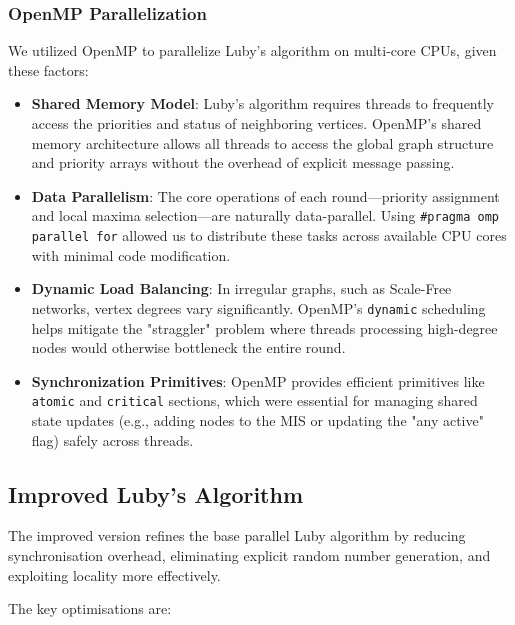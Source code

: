 \documentclass{article}
\begin{document}
\subsubsection{OpenMP Parallelization}
We utilized OpenMP to parallelize Luby's algorithm on multi-core CPUs, given these factors:
\begin{itemize}
    \item \textbf{Shared Memory Model}: Luby's algorithm requires threads to frequently access the priorities and status of neighboring vertices. OpenMP's shared memory architecture allows all threads to access the global graph structure and priority arrays without the overhead of explicit message passing.
    \item \textbf{Data Parallelism}: The core operations of each round—priority assignment and local maxima selection—are naturally data-parallel. Using \texttt{\#pragma omp parallel for} allowed us to distribute these tasks across available CPU cores with minimal code modification.
    \item \textbf{Dynamic Load Balancing}: In irregular graphs, such as Scale-Free networks, vertex degrees vary significantly. OpenMP's \texttt{dynamic} scheduling helps mitigate the "straggler" problem where threads processing high-degree nodes would otherwise bottleneck the entire round.
    \item \textbf{Synchronization Primitives}: OpenMP provides efficient primitives like \texttt{atomic} and \texttt{critical} sections, which were essential for managing shared state updates (e.g., adding nodes to the MIS or updating the "any active" flag) safely across threads.
\end{itemize}

\subsection{Improved Luby's Algorithm}
The improved version refines the base parallel Luby algorithm by reducing synchronisation overhead,
eliminating explicit random number generation, and exploiting locality more effectively.

The key optimisations are:
\end{document}
